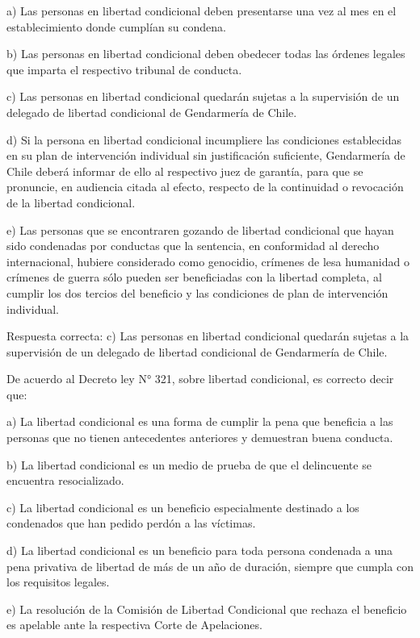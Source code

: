 \documentclass[letterpaper, 11pt]{article}
\begin{document}
a) Las personas en libertad condicional deben presentarse una vez al mes en el
establecimiento donde cumplían su condena.

b) Las personas en libertad condicional deben obedecer todas las órdenes legales que
imparta el respectivo tribunal de conducta.

c) Las personas en libertad condicional quedarán sujetas a la supervisión de un delegado
de libertad condicional de Gendarmería de Chile.

d) Si la persona en libertad condicional incumpliere las condiciones establecidas en su plan
de intervención individual sin justificación suficiente, Gendarmería de Chile deberá informar
de ello al respectivo juez de garantía, para que se pronuncie, en audiencia citada al efecto,
respecto de la continuidad o revocación de la libertad condicional.

e) Las personas que se encontraren gozando de libertad condicional que hayan sido
condenadas por conductas que la sentencia, en conformidad al derecho internacional,
hubiere considerado como genocidio, crímenes de lesa humanidad o crímenes de guerra
sólo pueden ser beneficiadas con la libertad completa, al cumplir los dos tercios del
beneficio y las condiciones de plan de intervención individual.

Respuesta correcta:
c) Las personas en libertad condicional quedarán sujetas a la
supervisión de un delegado de libertad condicional de Gendarmería de Chile.



De acuerdo al Decreto ley N° 321, sobre libertad condicional, es correcto decir que:

a) La libertad condicional es una forma de cumplir la pena que beneficia a las personas que
no tienen antecedentes anteriores y demuestran buena conducta.

b) La libertad condicional es un medio de prueba de que el delincuente se encuentra
resocializado.

c) La libertad condicional es un beneficio especialmente destinado a los condenados que
han pedido perdón a las víctimas.

d) La libertad condicional es un beneficio para toda persona condenada a una pena privativa
de libertad de más de un año de duración, siempre que cumpla con los requisitos legales.

e) La resolución de la Comisión de Libertad Condicional que rechaza el beneficio es
apelable ante la respectiva Corte de Apelaciones.
\end{document}
